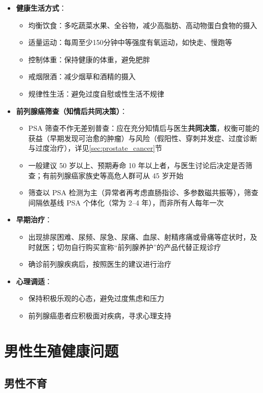 \documentclass[12pt,a4paper,twoside]{ctexbook}
\begin{document}
\begin{itemize}
\item \textbf{健康生活方式}：
  \begin{itemize}
  \item 均衡饮食：多吃蔬菜水果、全谷物，减少高脂肪、高动物蛋白食物的摄入
  \item 适量运动：每周至少150分钟中等强度有氧运动，如快走、慢跑等
  \item 控制体重：保持健康的体重，避免肥胖
  \item 戒烟限酒：减少烟草和酒精的摄入
  \item 规律性生活：避免过度自慰或性生活不规律
  \end{itemize}
\item \textbf{前列腺癌筛查（知情后共同决策）}：
  \begin{itemize}
  \item PSA 筛查不作无差别普查：应在充分知情后与医生\textbf{共同决策}，权衡可能的获益（早期发现可治愈的肿瘤）与风险（假阳性、穿刺并发症、过度诊断与过度治疗），详见\ref{sec:prostate_cancer}节
  \item 一般建议 50 岁以上、预期寿命 10 年以上者，与医生讨论后决定是否筛查；有前列腺癌家族史等高危人群可从 45 岁开始
  \item 筛查以 PSA 检测为主（异常者再考虑直肠指诊、多参数磁共振等），筛查间隔依基线 PSA 个体化（常为 2--4 年），而非所有人每年一次
  \end{itemize}
\item \textbf{早期治疗}：
  \begin{itemize}
  \item 出现排尿困难、尿频、尿急、尿痛、血尿、射精疼痛或骨痛等症状时，及时就医；切勿自行购买宣称“前列腺养护”的产品代替正规诊疗
  \item 确诊前列腺疾病后，按照医生的建议进行治疗
  \end{itemize}
\item \textbf{心理调适}：
  \begin{itemize}
  \item 保持积极乐观的心态，避免过度焦虑和压力
  \item 前列腺癌患者应积极面对疾病，寻求心理支持
  \end{itemize}
\end{itemize}

\chapter{男性生殖健康问题}

\section{男性不育}\label{sec:male_infertility}
\end{document}
